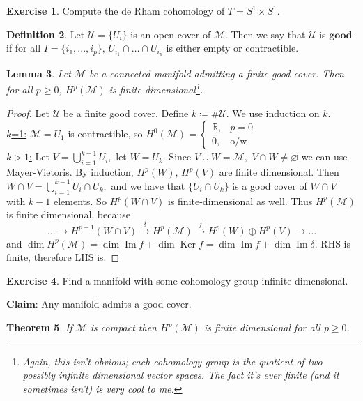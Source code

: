 \documentclass[10pt]{article}
\theoremstyle{plain}
\newtheorem{thm}{Theorem}[section] %
\newtheorem{lemma}[thm]{Lemma}
\theoremstyle{definition}
\newtheorem{defn}[thm]{Definition} %
\newtheorem{exercise}[thm]{Exercise}
\newcommand{\Claim}{\textbf{Claim: }}
\newcommand{\Real}{\mathbb{R}}
\newcommand{\man}{\mathcal{M}}
\newcommand{\allthe}[3]{{#1}_{#2},...,{#1}_{#3}}
\DeclareMathOperator{\Ker}{Ker}
\DeclareMathOperator{\Ima}{Im}
\newcommand{\cohomman}[1]{H^{#1}(\man)}
\newcommand{\cohom}[2]{H^{#1}(#2)}
\newcommand{\mysection}[1]{
    \setcounter{thm}{0}
    \section*{#1}
    \addcontentsline{toc}{section}{#1}
    \addtocounter{section}{1}
    \setcounter{subsection}{0}

}
\begin{document}
\begin{exercise}
Compute the de Rham cohomology of $T = S^1 \times S^1$.
\end{exercise} 
\begin{defn}
Let $\mathcal{U} = \{U_i\}$ is an open cover of $\man$. Then we say that $\mathcal{U}$ is $\textbf{good}$ if for all $I = \{\allthe{i}{1}{p}\}, \, U_{i_1} \cap \dots \cap U_{i_p}$ is either empty or contractible.
\end{defn}
\begin{lemma}
Let $\man$ be a connected manifold admitting a finite good cover. Then for all $p\geq 0$, $\cohomman{p}$ is finite-dimensional\footnote{Again, this isn't obvious; each cohomology group is the quotient of two possibly infinite dimensional vector spaces. The fact it's ever finite (and it sometimes isn't) is very cool to me.}.
\end{lemma}
\begin{proof}
Let $\mathcal{U}$ be a finite good cover. Define $k \coloneqq \# \mathcal{U}.$ We use induction on $k$.\\
\underline{$k$=1:} $\man = U_1$ is contractible, so $\cohomman{0} = \begin{cases} \Real,& p = 0 \\ 0, & \text{o/w} \end{cases}$\\
\underline{$k>1$:} Let $V = \bigcup\limits_{i=1}^{k-1} U_i,$ let $W =U_k $. Since $V\cup W = \man,$ $V\cap W \neq \varnothing$ we can use Mayer-Vietoris. By induction, $H^p(W), \, \cohom{p}{V}$ are finite dimensional. Then $W\cap V = \bigcup\limits_{i=1}^{k-1} U_i \cap U_k,$ and we have that $\{U_i \cap U_k\}$ is a good cover of $W\cap V$ with $k-1$ elements. So $\cohom{p}{W\cap V}$ is finite-dimensional as well. Thus $\cohomman{p}$ is finite dimensional, because
$$\dots \to \cohom{p-1}{W\cap V} \xrightarrow{\delta}\cohomman{p} \xrightarrow{f} \cohom{p}{W} \oplus \cohom{p}{V} \to \dots$$
and $\dim \cohomman{p} = \dim \Ima f + \dim \Ker f = \dim \Ima f + \dim \Ima \delta.$ RHS is finite, therefore LHS is.
\end{proof}
\begin{exercise}
Find a manifold with some cohomology group infinite dimensional.
\end{exercise}\noindent
$\Claim$Any manifold admits a good cover.
\begin{thm}
If $\man$ is compact then $\cohomman{p}$ is finite dimensional for all $p\geq 0$.
\end{thm}
\end{document}
